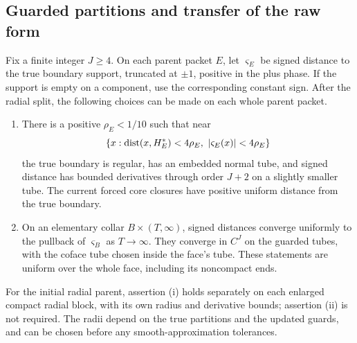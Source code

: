 \subsection{Guarded partitions and transfer of the raw form}

\begin{lemma}\label{regular:guards}
Fix a finite integer $J\ge4$.  On each parent packet $E$, let
$\varsigma_E$ be signed distance to the true boundary support, truncated
at $\pm1$, positive in the plus phase.  If the support is empty on a
component, use the corresponding constant sign.  After the radial split,
the following choices can be made on each whole parent packet.
\begin{enumerate}[label=(\roman*)]
\item There is a positive $\rho_E<1/10$ such that near
\[
 \{x:\dist(x,H_E^*)<4\rho_E,\ |\varsigma_E(x)|<4\rho_E\}
\]
the true boundary is regular, has an embedded normal tube, and signed
distance has bounded derivatives through order $J+2$ on a slightly
smaller tube.  The current forced core closures have positive uniform
distance from the true boundary.
\item On an elementary collar $B\times(T,\infty)$, signed distances
converge uniformly to the pullback of $\varsigma_B$ as $T\to\infty$.
They converge in $C^J$ on the guarded tubes, with the coface tube chosen
inside the face's tube.  These statements are uniform over the whole
face, including its noncompact ends.
\end{enumerate}
For the initial radial parent, assertion \textup{(i)} holds separately
on each enlarged compact radial block, with its own radius and derivative
bounds; assertion \textup{(ii)} is not required.
The radii depend on the true partitions and the updated guards, and can
be chosen before any smooth-approximation tolerances.
\end{lemma}


